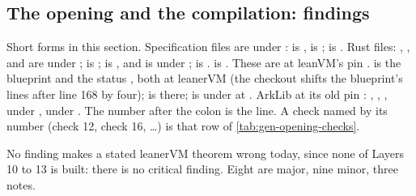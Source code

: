 \subsection{The opening and the compilation: findings}\label{sec:gen-opening-findings}

\begin{sloppypar}
Short forms in this section. Specification files are under :  is
,  is ;
 is . Rust files: ,
,  and  are under
;  is ;  is
, and  is under ;
 is .  is
. These are at leanVM's pin .  is the
blueprint  and  the status
, both at leanerVM  (the checkout 
shifts the blueprint's lines after line 168 by four);  is
 there;  is under  at
. ArkLib at its old pin : , ,
,  under ,
 under . The number after the colon is the
line. A check named by its number (check 12, check 16, \dots) is that row of \cref{tab:gen-opening-checks}.
\end{sloppypar}

No finding makes a stated leanerVM theorem wrong today, since none of Layers 10 to 13 is built:
there is no critical finding. Eight are major, nine minor, three notes.

